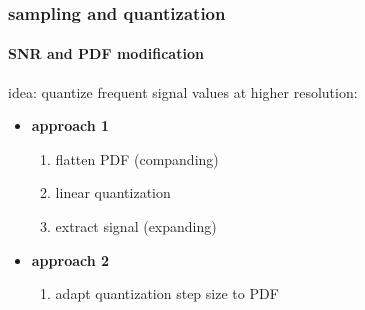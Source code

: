 	\begin{frame}\frametitle{sampling and quantization}\framesubtitle{SNR and PDF modification}
		idea: quantize frequent signal values at higher resolution:
		
		\pause
		\begin{itemize}
			\item \textbf{approach 1 }	
				\begin{enumerate}
					\item	flatten PDF (companding)
					\item	linear quantization
					\item	extract signal (expanding)
				\end{enumerate}
			\pause
            \pause
            \item \textbf{approach 2 }	
				\begin{enumerate}
					\item	adapt quantization step size to PDF
				\end{enumerate}

		\end{itemize}
	\end{frame}	


